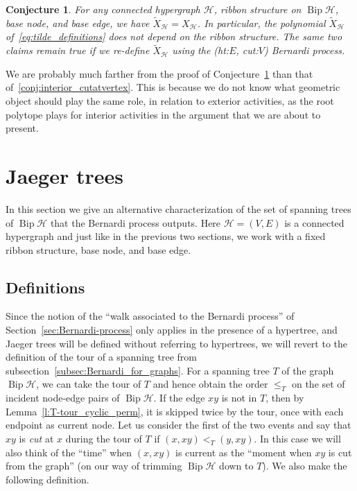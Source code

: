 \documentclass[10pt]{amsart}
\newtheorem{conj}[theo]{Conjecture}
\theoremstyle{definition}\newtheorem{defi}[theo]{Definition}
\theoremstyle{remark}\newtheorem{rema}[theo]{Remark}
\newcommand{\HH}{\mathcal H}
\DeclareMathOperator{\bip}{Bip}
\DeclareMathOperator{\Bip}{Bip}
\begin{document}
\begin{conj}
\label{conj:exterior}
For any connected hypergraph $\HH$, ribbon structure on $\bip\HH$, base node, and base edge, we have $\tilde{X}_\HH=X_\HH$. In particular, the polynomial $\tilde{X}_{\HH}$ of~\eqref{eq:tilde_definitions} does not depend on the ribbon structure. The same two claims remain true if we re-define $\tilde{X}_\HH$ using the (ht:$E$, cut:$V$) Bernardi process.
\end{conj}

We are probably much farther from the proof of Conjecture~\ref{conj:exterior} than that of~\ref{conj:interior_cutatvertex}. This is because we do not know what geometric object should play the same role, in relation to exterior activities, as the root polytope plays for interior activities in the argument that we are about to present.



\section{Jaeger trees}
\label{sec:Jaeger_trees}

In this section we give an alternative characterization of the set of spanning trees of $\Bip \HH$ that the Bernardi process outputs. Here $\HH=(V,E)$ is a connected hypergraph and just like in the previous two sections, we work with a fixed ribbon structure, base node, and base edge.


\subsection{Definitions}

Since the notion of the ``walk associated to the Bernardi process'' of Section~\ref{sec:Bernardi-process} only applies in the presence of a hypertree, and Jaeger trees will be defined without referring to hypertrees, we will revert to the definition of the tour of a spanning tree from subsection~\ref{subsec:Bernardi_for_graphs}. For a spanning tree $T$ of the graph $\bip \HH$, we can take the tour of $T$ and hence obtain the order $\leq_T$ on the set of incident node-edge pairs of $\bip \HH$. If the edge $xy$ is not in $T$, then by Lemma~\ref{l:T-tour_cyclic_perm}, it is skipped twice by the tour, once with each endpoint as current node. Let us consider the first of the two events and say that $xy$ is \emph{cut} at $x$ during the tour of $T$ if $(x,xy)<_T (y,xy)$. In this case we will also think of the ``time'' when $(x,xy)$ is current as the ``moment when $xy$ is cut from the graph'' (on our way of trimming $\bip\HH$ down to $T$). We also make the following definition. 
\end{document}
